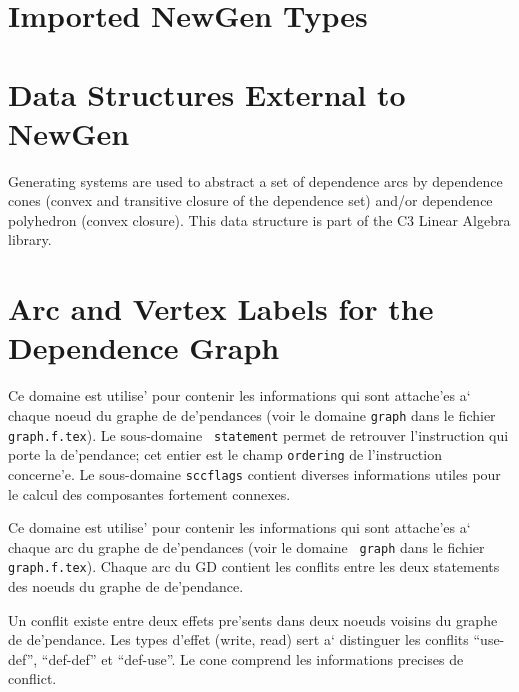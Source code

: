 \section*{Imported NewGen Types}

\iffalse
\domain{Import statement from "ri.newgen"}
{}
\fi

{}

{}

\section*{Data Structures External to NewGen}

Generating systems are used to abstract a set of dependence arcs by
dependence cones (convex and transitive closure of the dependence set)
and/or dependence polyhedron (convex closure). This data structure is
part of the C3 Linear Algebra library.


\section*{Arc and Vertex Labels for the Dependence Graph}

{}

Ce domaine est utilise' pour contenir les informations qui sont
attache'es a` chaque noeud du graphe de de'pendances (voir le domaine
{\tt graph} dans le fichier {\tt graph.f.tex}). Le sous-domaine {\tt
statement} permet de retrouver l'instruction qui porte la de'pendance;
cet entier est le champ {\tt ordering} de l'instruction concerne'e. Le
sous-domaine {\tt sccflags} contient diverses informations utiles pour
le calcul des composantes fortement connexes.

{}

Ce domaine est utilise' pour contenir les informations qui sont
attache'es a` chaque arc du graphe de de'pendances (voir le domaine {\tt
graph} dans le fichier {\tt graph.f.tex}). Chaque arc du GD contient les
conflits entre les deux statements des noeuds du graphe de de'pendance.

{}

Un conflit existe entre deux effets pre'sents dans deux noeuds voisins
du graphe de de'pendance. Les types d'effet (write, read) sert a`
distinguer les conflits ``use-def'', ``def-def'' et ``{def-use}''. Le
cone comprend les informations precises de conflict.

